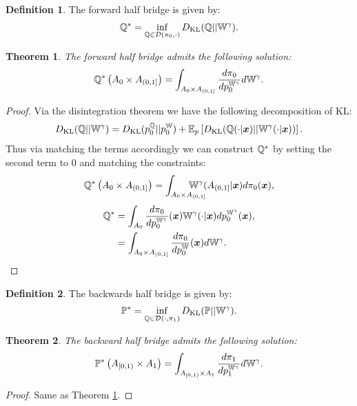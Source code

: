 \documentclass[a4paper,12pt,twoside,openright]{report}
\newtheorem{theorem}{Theorem}
\theoremstyle{definition}
\newtheorem{definition}{Definition}[section]
\begin{document}
\begin{definition}
The forward half bridge is given by:
    \begin{align}
        {{\mathbb{Q}}}^{*} = \inf_{{\mathbb{Q}}  \in {\mathcal{D}}(\pi_0, \cdot)} D_{\mathrm{KL}} ({\mathbb{Q}} || \mathbb{W}^\gamma) .
    \end{align}
\end{definition}
\begin{theorem}\label{thrm:half_bridge_forward}
    The forward half bridge admits the following solution: 
\begin{align}
    {{\mathbb{Q}}}^{*}\left(A_0 \times A_{(0,1]}\right) =  \int_{A_0\times A_{(0,1]}} \frac{d \pi_0}{ dp_0^{\mathbb{W}^\gamma}} d\mathbb{W}^\gamma.
\end{align}
\end{theorem}
\begin{proof}
Via the disintegration theorem we have the following decomposition of KL:
\begin{align}
    D_{\mathrm{KL}}({\mathbb{Q}} || \mathbb{W}^\gamma) = D_{\mathrm{KL}}(p_0^{\mathbb{Q}}|| p_0^{\mathbb{W}} )  + \mathbb{E}_p\left[D_{\mathrm{KL}}({\mathbb{Q}}(\cdot| {\bm{x}}) || \mathbb{W}^\gamma(\cdot | {\bm{x}}))\right]. \nonumber
\end{align}
Thus via matching the terms accordingly we can construct ${\mathbb{Q}}^*$ by setting the second term to $0$ and matching the constraints:
\begin{align}
    {\Q}^{*}\left(A_0 \times A_{(0,1]}\right) = \int_{A_0 \times A_{(0,1]}}\!\!\!\!\!\!\!\!\!\!\!\!\W^\gamma(A_{(0,1]} | \vx) d\pi_0(\vx),
\end{align}
\begin{align}
    {{\mathbb{Q}}}^{*} &= \int_{A_0}  \frac{d\pi_0}{dp_0^{\mathbb{W}^\gamma}}({\bm{x}})   \mathbb{W}^\gamma(\cdot | {\bm{x}}) d p_0^{\mathbb{W}^{\gamma}}({\bm{x}}) , \nonumber \\
    &= \int_{A_0 \times A_{(0,1]} }  \frac{d\pi_0}{dp_0^{\mathbb{W}}}({\bm{x}})  d \mathbb{W}^{\gamma}.
\end{align}
\end{proof}
\begin{definition}
The backwards half bridge is given by:
    \begin{align}
        {{\mathbb{P}}}^{*} = \inf_{{\mathbb{Q}}  \in {\mathcal{D}}(\cdot, \pi_1)} D_{\mathrm{KL}} ({\mathbb{P}} || \mathbb{W}^\gamma) .
    \end{align}
\end{definition}
\begin{theorem}\label{thrm:half_bridge_backward}
     The backward half bridge admits the following solution: 
\begin{align}
    {{\mathbb{P}}}^{*}\left( A_{[0,1)} \times A_1\right) =  \int_{ A_{[0,1)} \times A_1}  \frac{d \pi_1}{ d p_1^{\mathbb{W}^\gamma} } d\mathbb{W}^\gamma.
\end{align}

\end{theorem}
\begin{proof}
Same as Theorem \ref{thrm:half_bridge_forward}.
\end{proof}
\end{document}
